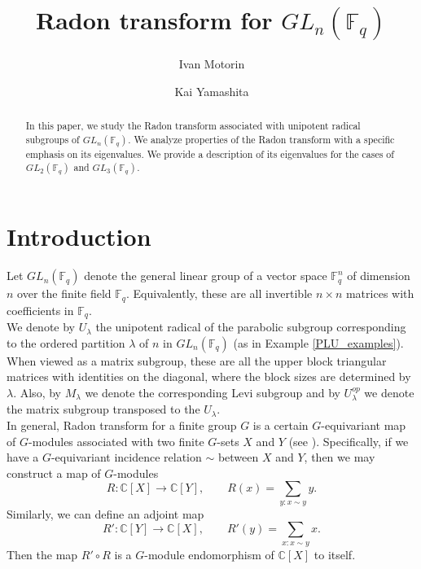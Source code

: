 \documentclass[12pt,reqno]{amsart}
\title{Radon transform for $GL_n(\mathbb{F}_q)$}
\author{Ivan Motorin}
\author{Kai Yamashita}
\theoremstyle{definition}
\theoremstyle{remark}
\numberwithin{equation}{section}
\newcommand{\CC}{\mathbb{C}}
\newcommand{\GL}[1]{GL_{#1}(\mathbb{F}_q)}
\begin{document}
\begin{abstract}
    In this paper, we study the Radon transform associated with unipotent radical subgroups of $GL_n(\mathbb{F}_q)$. We analyze properties of the Radon transform with a specific emphasis on its eigenvalues. %
    We provide a description of its eigenvalues for the cases of $\GL{2}$ and $\GL{3}$.%
\end{abstract}
\maketitle

\tableofcontents

\section{Introduction}
Let $GL_n (\mathbb{F}_q)$ denote the general linear group of a vector space $\mathbb{F}_q^n$ of dimension $n$ over the finite field $\mathbb{F}_q$. Equivalently, these are all invertible $n\times n$ matrices with coefficients in $\mathbb{F}_q$.\\ 

We denote by $U_\lambda$ the unipotent radical of the parabolic subgroup corresponding to the ordered partition $\lambda$ of $n$ in $GL_n (\mathbb{F}_q)$ (as in Example \ref{PLU_examples}). When viewed as a matrix subgroup, these are all the upper block triangular matrices with identities on the diagonal, where the block sizes are determined by $\lambda$. Also, by $M_{\lambda}$ we denote the corresponding Levi subgroup and by $U_{\lambda}^{op}$ we denote the matrix subgroup transposed to the $U_{\lambda}$.\\


In general, Radon transform for a finite group $G$ is a certain $G$-equivariant map of $G$-modules associated with two finite $G$-sets $X$ and $Y$ (see \cite{O}). Specifically, if we have a $G$-equivariant incidence relation $\sim$ between $X$ and $Y$, then we may construct a map of $G$-modules
\[
R: \CC[X] \rightarrow \CC[Y],\qquad R(x)=\sum_{y: x\sim y} y.
\]
Similarly, we can define an adjoint map
\[
R': \CC[Y] \rightarrow \CC[X], \qquad R'(y)=\sum_{x:x\sim y}x.
\]
Then the map $R'\circ R$ is a $G$-module endomorphism of $\CC[X]$ to itself.\\
\end{document}
